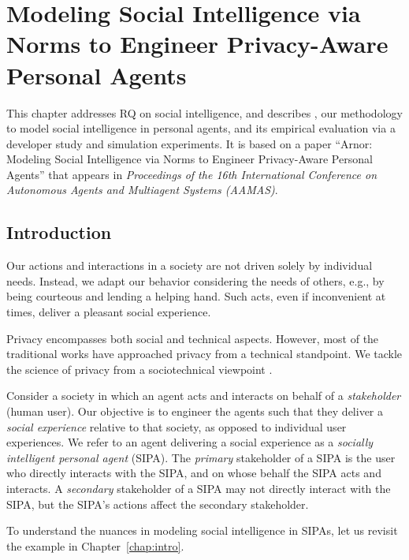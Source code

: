 \chapter[Modeling Social Intelligence via Norms]{Modeling Social Intelligence via Norms to Engineer Privacy-Aware Personal Agents}
\label{chap:arnor}

This chapter addresses RQ on social intelligence, and describes \frameworkA, our methodology to model social
intelligence in personal agents, and its empirical evaluation via a
developer study and simulation experiments. It is based on a
paper ``Arnor: Modeling Social Intelligence via Norms to Engineer
Privacy-Aware Personal Agents'' that appears in \emph{Proceedings of the
16th International Conference on Autonomous Agents and Multiagent
Systems (AAMAS)}.

\section{Introduction}
\label{sec:arnor-intro}

Our actions and interactions in a society are not driven solely by
individual needs. Instead, we adapt our behavior considering the needs
of others, e.g., by being courteous and lending a helping hand. Such
acts, even if inconvenient at times, deliver a pleasant social
experience.

Privacy encompasses both social and technical aspects. However, most of
the traditional works have approached privacy from a technical
standpoint. We tackle the science of privacy from a sociotechnical
viewpoint \citep{Kafali-IS16-Revani,WWW-16:IOSE}.

Consider a society in which an agent acts and interacts on behalf of a
\emph{stakeholder} (human user). Our objective is to engineer the agents
such that they deliver a \emph{social experience} relative to that
society, as opposed to individual user experiences. We refer to an agent
delivering a social experience as a \emph{socially intelligent personal
agent} (SIPA). The \emph{primary} stakeholder of a SIPA is the user who
directly interacts with the SIPA, and on whose behalf the SIPA acts and
interacts. A \emph{secondary} stakeholder of a SIPA may not directly
interact with the SIPA, but the SIPA's actions affect the secondary
stakeholder.

To understand the nuances in modeling social intelligence in SIPAs, 
let us revisit the example in Chapter~\ref{chap:intro}. 

